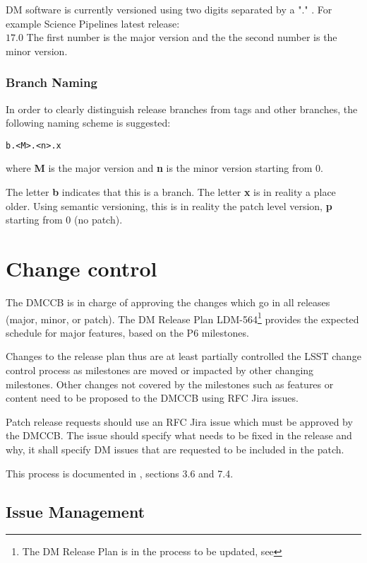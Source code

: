 DM software is currently versioned using two digits separated by a "." .
For example Science Pipelines latest release:\\
$17.0$
The first number is the major version and the the second number is the minor version.


\subsubsection{Branch Naming} \label{sec:branchnaming}

In order to clearly distinguish release branches from tags and other branches, the following naming scheme is suggested:

\begin{verbatim}
b.<M>.<n>.x
\end{verbatim}

where {\bf M} is the major version and {\bf n} is the minor version starting from 0.

The letter  {\bf b} indicates that this is a branch.
The letter {\bf x} is in reality a place older. Using semantic versioning, this is in reality the patch level version, {\bf p} starting from 0 (no patch).

\newpage
\section{Change control} \label{sec:changecontrol}

The DMCCB is in charge of approving the changes which go in  all releases (major, minor, or patch).
The DM Release Plan LDM-564\footnote{The DM Release Plan is in the process to be updated, see } 
provides the expected schedule for major features, based on the P6 milestones.

Changes to the release plan  thus are  at least partially controlled the LSST change control  process as  milestones are moved or impacted by other changing milestones. Other changes not covered by the milestones such as features or content need to be proposed to the DMCCB using RFC Jira issues.

Patch release requests should use an RFC Jira issue which must be approved by the DMCCB.
The issue should specify what needs to be fixed in the release and why, it shall specify DM issues that are requested to be included in the patch.

This process is documented in , sections 3.6 and 7.4.


\subsection{Issue Management} \label{sec:issues}

